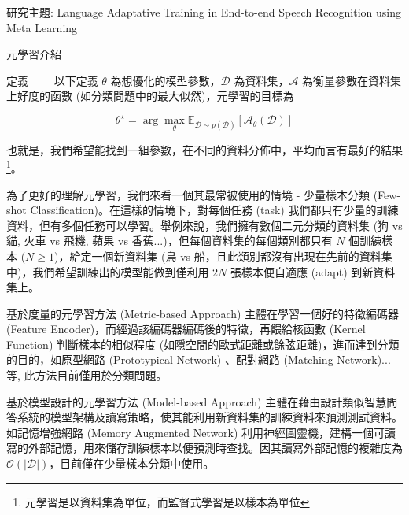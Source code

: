 \documentclass[12pt,UTF8,fntef]{article}
\begin{document}
\begin{section}{研究主題: Language Adaptative Training in End-to-end Speech Recognition using Meta Learning}
\begin{subsection}{元學習介紹}
    \begin{subsubsection}{定義}
      ~~~~以下定義 $\theta$ 為想優化的模型參數，$\mathcal{D}$ 為資料集，$\mathcal{A}$ 為衡量參數在資料集上好度的函數 (如分類問題中的最大似然)，元學習的目標為

      \begin{equation}
        \theta^{\star} = \arg \max_\theta \mathbb{E}_{\mathcal{D} \sim p(\mathcal{D}) }[\mathcal{A}_\theta(\mathcal{D})]
      \end{equation}

      也就是，我們希望能找到一組參數，在不同的資料分佈中，平均而言有最好的結果\footnote{元學習是以資料集為單位，而監督式學習是以樣本為單位}。

      為了更好的理解元學習，我們來看一個其最常被使用的情境 - 少量樣本分類 (Few-shot Classification)。在這樣的情境下，對每個任務 (task) 我們都只有少量的訓練資料，但有多個任務可以學習。舉例來說，我們擁有數個二元分類的資料集 (狗 vs 貓, 火車 vs 飛機, 蘋果 vs 香蕉...)，但每個資料集的每個類別都只有 $N$ 個訓練樣本 ($N \geq 1$)，給定一個新資料集 (鳥 vs 船，且此類別都沒有出現在先前的資料集中)，我們希望訓練出的模型能做到僅利用 $2N$ 張樣本便自適應 (adapt) 到新資料集上。


    \end{subsubsection}

    \begin{subsubsection}{基於度量的元學習方法 (Metric-based Approach)}
  主體在學習一個好的特徵編碼器 (Feature Encoder)，而經過該編碼器編碼後的特徵，再餵給核函數 (Kernel Function) 判斷樣本的相似程度 (如隱空間的歐式距離或餘弦距離)，進而達到分類的目的，如原型網路 (Prototypical Network) \cite{snell2017prototypical}、配對網路 (Matching Network)\cite{vinyals2016matching}...等, 此方法目前僅用於分類問題。
    \end{subsubsection}

    \begin{subsubsection}{基於模型設計的元學習方法 (Model-based Approach)}
      主體在藉由設計類似智慧問答系統的模型架構及讀寫策略，使其能利用新資料集的訓練資料來預測測試資料。如記憶增強網路 (Memory Augmented Network) \cite{santoro2016meta}利用神經圖靈機，建構一個可讀寫的外部記憶，用來儲存訓練樣本以便預測時查找。因其讀寫外部記憶的複雜度為 $\mathcal{O}(|\mathcal{D}|)$，目前僅在少量樣本分類中使用。
    \end{subsubsection}


\end{subsection}
\end{section}
\end{document}
